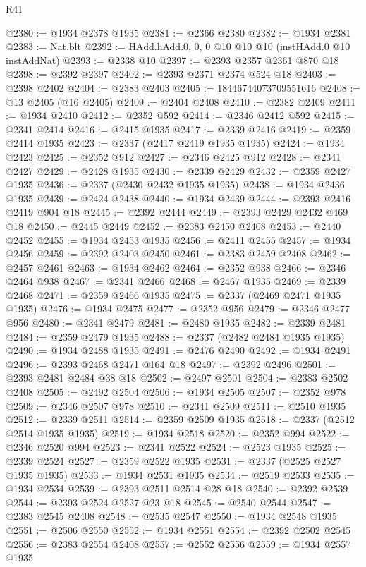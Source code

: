 \begin{lexlean}{R41}
\begin{coremodule}
@2380 := @1934 @2378 @1935
@2381 := @2366 @2380
@2382 := @1934 @2381
@2383 := Nat.blt
@2392 := HAdd.hAdd.{0, 0, 0} @10 @10 @10 (instHAdd.{0} @10 instAddNat)
@2393 := @2338 @10
@2397 := @2393 @2357 @2361 @870 @18
@2398 := @2392 @2397
@2402 := @2393 @2371 @2374 @524 @18
@2403 := @2398 @2402
@2404 := @2383 @2403
@2405 := 18446744073709551616
@2408 := @13 @2405 (@16 @2405)
@2409 := @2404 @2408
@2410 := @2382 @2409
@2411 := @1934 @2410
@2412 := @2352 @592
@2414 := @2346 @2412 @592
@2415 := @2341 @2414
@2416 := @2415 @1935
@2417 := @2339 @2416
@2419 := @2359 @2414 @1935
@2423 := @2337 (@2417 @2419 @1935 @1935)
@2424 := @1934 @2423
@2425 := @2352 @912
@2427 := @2346 @2425 @912
@2428 := @2341 @2427
@2429 := @2428 @1935
@2430 := @2339 @2429
@2432 := @2359 @2427 @1935
@2436 := @2337 (@2430 @2432 @1935 @1935)
@2438 := @1934 @2436 @1935
@2439 := @2424 @2438
@2440 := @1934 @2439
@2444 := @2393 @2416 @2419 @904 @18
@2445 := @2392 @2444
@2449 := @2393 @2429 @2432 @469 @18
@2450 := @2445 @2449
@2452 := @2383 @2450 @2408
@2453 := @2440 @2452
@2455 := @1934 @2453 @1935
@2456 := @2411 @2455
@2457 := @1934 @2456
@2459 := @2392 @2403 @2450
@2461 := @2383 @2459 @2408
@2462 := @2457 @2461
@2463 := @1934 @2462
@2464 := @2352 @938
@2466 := @2346 @2464 @938
@2467 := @2341 @2466
@2468 := @2467 @1935
@2469 := @2339 @2468
@2471 := @2359 @2466 @1935
@2475 := @2337 (@2469 @2471 @1935 @1935)
@2476 := @1934 @2475
@2477 := @2352 @956
@2479 := @2346 @2477 @956
@2480 := @2341 @2479
@2481 := @2480 @1935
@2482 := @2339 @2481
@2484 := @2359 @2479 @1935
@2488 := @2337 (@2482 @2484 @1935 @1935)
@2490 := @1934 @2488 @1935
@2491 := @2476 @2490
@2492 := @1934 @2491
@2496 := @2393 @2468 @2471 @164 @18
@2497 := @2392 @2496
@2501 := @2393 @2481 @2484 @38 @18
@2502 := @2497 @2501
@2504 := @2383 @2502 @2408
@2505 := @2492 @2504
@2506 := @1934 @2505
@2507 := @2352 @978
@2509 := @2346 @2507 @978
@2510 := @2341 @2509
@2511 := @2510 @1935
@2512 := @2339 @2511
@2514 := @2359 @2509 @1935
@2518 := @2337 (@2512 @2514 @1935 @1935)
@2519 := @1934 @2518
@2520 := @2352 @994
@2522 := @2346 @2520 @994
@2523 := @2341 @2522
@2524 := @2523 @1935
@2525 := @2339 @2524
@2527 := @2359 @2522 @1935
@2531 := @2337 (@2525 @2527 @1935 @1935)
@2533 := @1934 @2531 @1935
@2534 := @2519 @2533
@2535 := @1934 @2534
@2539 := @2393 @2511 @2514 @28 @18
@2540 := @2392 @2539
@2544 := @2393 @2524 @2527 @23 @18
@2545 := @2540 @2544
@2547 := @2383 @2545 @2408
@2548 := @2535 @2547
@2550 := @1934 @2548 @1935
@2551 := @2506 @2550
@2552 := @1934 @2551
@2554 := @2392 @2502 @2545
@2556 := @2383 @2554 @2408
@2557 := @2552 @2556
@2559 := @1934 @2557 @1935

\end{coremodule}
\end{lexlean}
